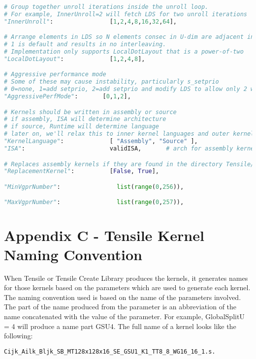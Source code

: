 \documentclass[]{article}
\begin{document}
\begin{lstlisting}[language=python,breaklines=true]
# Group together unroll iterations inside the unroll loop.
# For example, InnerUnroll=2 will fetch LDS for two unroll iterations
"InnerUnroll":                [1,2,4,8,16,32,64],

# Arrange elements in LDS so N elements consec in U-dim are adjacent in LDS
# 1 is default and results in no interleaving.
# Implementation only supports LocalDotLayout that is a power-of-two
"LocalDotLayout":             [1,2,4,8],

# Aggressive performance mode
# Some of these may cause instability, particularly s_setprio
# 0=none, 1=add setprio, 2=add setprio and modify LDS to allow only 2 waves/simd
"AggressivePerfMode":       [0,1,2],

# Kernels should be written in assembly or source
# if assembly, ISA will determine architecture
# if source, Runtime will determine language
# later on, we'll relax this to inner kernel languages and outer kernel languages, such as inline asm embedded in ocl or in llvm
"KernelLanguage":             [ "Assembly", "Source" ],
"ISA":                        validISA,       # arch for assembly kernels

# Replaces assembly kernels if they are found in the directory Tensile/Tensile/ReplacementKernels
"ReplacementKernel":          [False, True],

"MinVgprNumber":                list(range(0,256)),

"MaxVgprNumber":                list(range(0,257)),
\end{lstlisting}

\section{Appendix C - Tensile Kernel Naming Convention}
\label{sec:appendixC}

When Tensile or Tensile Create Library produces the kernels, it generates names for those kernels based on the parameters which are used to generate each kernel. The naming convention used is based on the name of the parameters involved. The part of the name produced from the parameter is an abbreviation of the name concatenated with the value of the parameter. For example, GlobalSplitU = 4 will produce a name part GSU4. The full name of a kernel looks like the following:

\begin{verbatim}
Cijk_Ailk_Bljk_SB_MT128x128x16_SE_GSU1_K1_TT8_8_WG16_16_1.s.
\end{verbatim}
\end{document}
